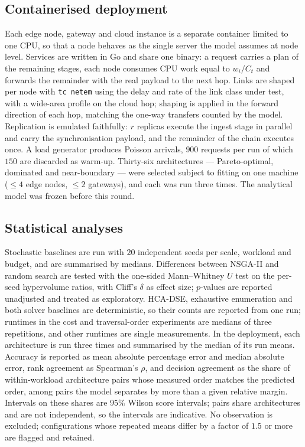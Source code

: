 \documentclass[pdflatex,sn-nature,lineno]{sn-jnl}
\begin{document}
\subsection{Containerised deployment}
Each edge node, gateway and cloud instance is a separate container limited to one CPU, so
that a node behaves as the single server the model assumes at node level. Services are
written in Go and share one binary: a request carries a plan of the remaining stages,
each node consumes CPU work equal to $w_i/C_t$ and forwards the remainder with the real
payload to the next hop. Links are shaped per node with \texttt{tc netem}
\cite{hemminger2005netem} using the delay and rate of the link class under test, with a
wide-area profile on the cloud hop; shaping is applied in the forward direction of each
hop, matching the one-way transfers counted by the model. Replication is emulated
faithfully: $r$ replicas execute the ingest stage in parallel and carry the
synchronisation payload, and the remainder of the chain executes once. A load generator
produces Poisson arrivals, $900$ requests per run of which $150$ are discarded as warm-up.
Thirty-six architectures --- Pareto-optimal, dominated and near-boundary --- were selected
subject to fitting on one machine ($\le4$ edge nodes, $\le2$ gateways), and each was run
three times. The analytical model was frozen before this round.

\subsection{Statistical analyses}
Stochastic baselines are run with $20$ independent seeds per scale, workload and budget,
and are summarised by medians. Differences between NSGA-II and random search are tested
with the one-sided Mann--Whitney $U$ test\cite{mann1947whitney} on the per-seed
hypervolume ratios, with Cliff's $\delta$\cite{cliff1993delta} as effect size;
$p$-values are reported unadjusted and treated as exploratory. HCA-DSE, exhaustive
enumeration and both solver baselines are deterministic, so their counts are reported
from one run; runtimes in the cost and traversal-order experiments are medians of three
repetitions, and other runtimes are single measurements. In the deployment, each architecture
is run three times and summarised by the median of its run means. Accuracy is reported as
mean absolute percentage error and median absolute error, rank agreement as Spearman's
$\rho$, and decision agreement as the share of within-workload architecture pairs whose
measured order matches the predicted order, among pairs the model separates by more than
a given relative margin. Intervals on these shares are $95\%$ Wilson score intervals;
pairs share architectures and are not independent, so the intervals are indicative. No
observation is excluded; configurations whose repeated means differ by a factor of $1.5$
or more are flagged and retained.
\end{document}
